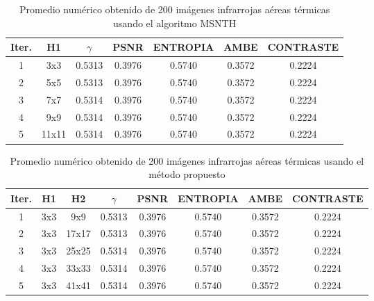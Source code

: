 \documentclass[a4paper, 11 pt, conference]{ieeeconf}      %
\begin{document}
\begin{table}[h]
\centering
\tiny
\caption{Promedio num\'erico obtenido de 200 im\'agenes infrarrojas a\'ereas t\'ermicas usando el algoritmo MSNTH}
\label{tabla_5}
\begin{center}
\begin{tabular}{ c c c c c c c }
\hline
\textbf{Iter.} & \textbf{H1} & \textbf{$\gamma$} & \textbf{PSNR} & \textbf{ENTROPIA} & \textbf{AMBE} & \textbf{CONTRASTE} \\
\hline
1 & 3x3 & 0.5313 & 0.3976 & 0.5740 & 0.3572 & 0.2224 \\
2 & 5x5 & 0.5313 & 0.3976 & 0.5740 & 0.3572 & 0.2224 \\
3 & 7x7 & 0.5314 & 0.3976 & 0.5740 & 0.3572 & 0.2224 \\
4 & 9x9 & 0.5314 & 0.3976 & 0.5740 & 0.3572 & 0.2224 \\
5 & 11x11 & 0.5314 & 0.3976 & 0.5740 & 0.3572 & 0.2224 \\
\hline
\end{tabular}
\end{center}
\end{table}
\normalsize

\begin{table}[h]
\centering
\tiny
\caption{Promedio num\'erico obtenido de 200 im\'agenes infrarrojas a\'ereas t\'ermicas usando el m\'etodo propuesto}
\label{tabla_6}
\begin{center}
\begin{tabular}{ c c c c c c c c }
\hline
\textbf{Iter.} & \textbf{H1} & \textbf{H2} & \textbf{$\gamma$} & \textbf{PSNR} & \textbf{ENTROPIA} & \textbf{AMBE} & \textbf{CONTRASTE} \\
\hline
1 & 3x3 & 9x9 & 0.5313 & 0.3976 & 0.5740 & 0.3572 & 0.2224 \\
2 & 3x3 & 17x17 & 0.5313 & 0.3976 & 0.5740 & 0.3572 & 0.2224 \\
3 & 3x3 & 25x25 & 0.5314 & 0.3976 & 0.5740 & 0.3572 & 0.2224 \\
4 & 3x3 & 33x33 & 0.5314 & 0.3976 & 0.5740 & 0.3572 & 0.2224 \\
5 & 3x3 & 41x41 & 0.5314 & 0.3976 & 0.5740 & 0.3572 & 0.2224 \\
\hline
\end{tabular}
\end{center}
\end{table}
\normalsize
\end{document}
